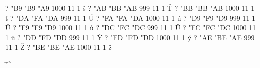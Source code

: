 \setcharcode  ?  "B9  "B9  "A9  1000  11  1  \texaccent \v s
\setcharcode  ?  "AB  "BB  "AB   999  11  1  \texaccent \v T
\setcharcode  ?  "BB  "BB  "AB  1000  11  1  \texaccent \v t
\setcharcode  ?  "DA  "FA  "DA   999  11  1  \texaccent \'U
\setcharcode  ?  "FA  "FA  "DA  1000  11  1  \texaccent \'u
\setcharcode  ?  "D9  "F9  "D9   999  11  1  \texaccent \r U
\setcharcode  ?  "F9  "F9  "D9  1000  11  1  \texaccent \r u
\setcharcode  ?  "DC  "FC  "DC   999  11  1  \texaccent \"U
\setcharcode  ?  "FC  "FC  "DC  1000  11  1  \texaccent \"u
\setcharcode  ?  "DD  "FD  "DD   999  11  1  \texaccent \'Y
\setcharcode  ?  "FD  "FD  "DD  1000  11  1  \texaccent \'y
\setcharcode  ?  "AE  "BE  "AE   999  11  1  \texaccent \v Z
\setcharcode  ?  "BE  "BE  "AE  1000  11  1  \texaccent \v z

\redefaccent \'
\redefaccent \v
\redefaccent \"
\redefaccent \^
\redefaccent \r



\endinput

